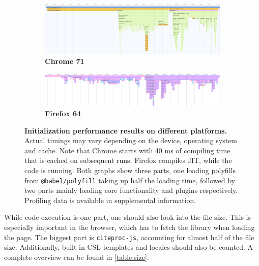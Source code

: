 \documentclass[fleqn,10pt,lineno]{wlpeerj} %
\begin{document}
\begin{figure}[bt!]
\begin{subfigure}{\textwidth}
\centering
\includegraphics[width=\linewidth]{figures/perf_chrome.png}
\caption{\textbf{Chrome 71}}
\label{fig:perf-chrome}
\end{subfigure}
\begin{subfigure}{\textwidth}
  \centering
  \includegraphics[width=\linewidth]{figures/perf_ff.png}
  \caption{\textbf{Firefox 64}}
  \label{fig:perf-ff}
\end{subfigure}
\caption{\textbf{Initialization performance results on different platforms.}
Actual timings may vary depending on the device, operating system and cache. Note that Chrome starts with 40 ms of compiling time that is cached on subsequent runs. Firefox compiles JIT, while the code is running. Both graphs show three parts, one loading polyfills from \texttt{@babel/polyfill} taking up half the loading time, followed by two parts mainly loading core functionality and plugins respectively. Profiling data is available in supplemental information.}
\label{fig:perf}
\end{figure}

While code execution is one part, one should also look into the file size. This is especially important in the browser, which has to fetch the library when loading the page. The biggest part is \texttt{citeproc-js}, accounting for almost half of the file size. Additionally, built-in CSL templates and locales should also be counted. A complete overview can be found in \ref{table:size}.
\end{document}
